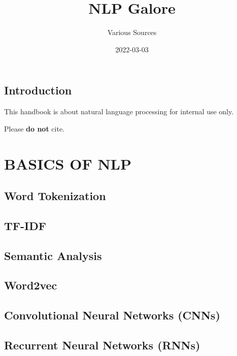 \documentclass[
]{book}
\title{NLP Galore}
\author{Various Sources}
\date{2022-03-03}
\begin{document}
\maketitle

{
\setcounter{tocdepth}{1}
\tableofcontents
}
\hypertarget{introduction}{%
\chapter{Introduction}\label{introduction}}

This handbook is about natural language processing for internal use only.

Please \textbf{do not} cite.

\hypertarget{part-basics-of-nlp}{%
\part*{BASICS OF NLP}\label{part-basics-of-nlp}}

\hypertarget{word-tokenization}{%
\chapter{Word Tokenization}\label{word-tokenization}}

\hypertarget{tf-idf}{%
\chapter{TF-IDF}\label{tf-idf}}

\hypertarget{semantic-analysis}{%
\chapter{Semantic Analysis}\label{semantic-analysis}}

\hypertarget{word2vec}{%
\chapter{Word2vec}\label{word2vec}}

\hypertarget{convolutional-neural-networks-cnns}{%
\chapter{Convolutional Neural Networks (CNNs)}\label{convolutional-neural-networks-cnns}}

\hypertarget{recurrent-neural-networks-rnns}{%
\chapter{Recurrent Neural Networks (RNNs)}\label{recurrent-neural-networks-rnns}}
\end{document}
